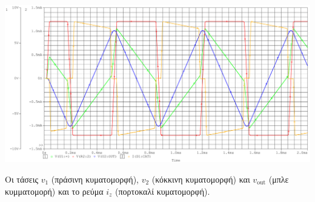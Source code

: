 \begin{plot_fig}[H]
	\begin{center}
		\includegraphics[width=15cm]{spice_01/q4.pdf}
		\caption{Οι τάσεις $v_1$ (πράσινη κυματομορφή), $v_2$ (κόκκινη κυματομορφή) και $v_{\mathrm{out}}$ (μπλε κυμματομορή) και το ρεύμα $i_z$ (πορτοκαλί κυματομορφή).}
		\label{plot:ask1:q4}
	\end{center}
\end{plot_fig}

